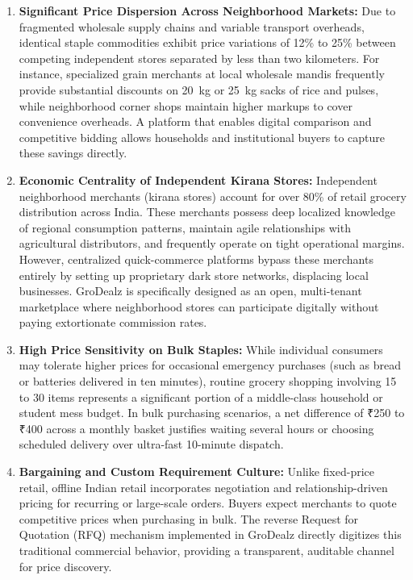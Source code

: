 \begin{enumerate}
    \item \textbf{Significant Price Dispersion Across Neighborhood Markets:} Due to fragmented wholesale supply chains and variable transport overheads, identical staple commodities exhibit price variations of 12\% to 25\% between competing independent stores separated by less than two kilometers. For instance, specialized grain merchants at local wholesale mandis frequently provide substantial discounts on 20~kg or 25~kg sacks of rice and pulses, while neighborhood corner shops maintain higher markups to cover convenience overheads. A platform that enables digital comparison and competitive bidding allows households and institutional buyers to capture these savings directly.
    \item \textbf{Economic Centrality of Independent Kirana Stores:} Independent neighborhood merchants (kirana stores) account for over 80\% of retail grocery distribution across India. These merchants possess deep localized knowledge of regional consumption patterns, maintain agile relationships with agricultural distributors, and frequently operate on tight operational margins. However, centralized quick-commerce platforms bypass these merchants entirely by setting up proprietary dark store networks, displacing local businesses. GroDealz is specifically designed as an open, multi-tenant marketplace where neighborhood stores can participate digitally without paying extortionate commission rates.
    \item \textbf{High Price Sensitivity on Bulk Staples:} While individual consumers may tolerate higher prices for occasional emergency purchases (such as bread or batteries delivered in ten minutes), routine grocery shopping involving 15 to 30 items represents a significant portion of a middle-class household or student mess budget. In bulk purchasing scenarios, a net difference of ₹250 to ₹400 across a monthly basket justifies waiting several hours or choosing scheduled delivery over ultra-fast 10-minute dispatch.
    \item \textbf{Bargaining and Custom Requirement Culture:} Unlike fixed-price retail, offline Indian retail incorporates negotiation and relationship-driven pricing for recurring or large-scale orders. Buyers expect merchants to quote competitive prices when purchasing in bulk. The reverse Request for Quotation (RFQ) mechanism implemented in GroDealz directly digitizes this traditional commercial behavior, providing a transparent, auditable channel for price discovery.
\end{enumerate}

